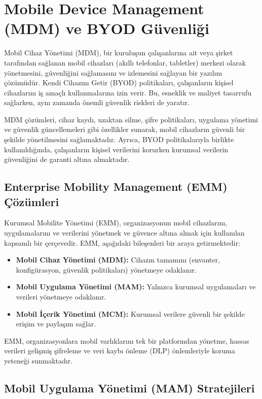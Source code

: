 \section{Mobile Device Management (MDM) ve BYOD Güvenliği}

Mobil Cihaz Yönetimi (MDM), bir kuruluşun çalışanlarına ait veya şirket tarafından sağlanan mobil cihazları (akıllı telefonlar, tabletler) merkezi olarak yönetmesini, güvenliğini sağlamasını ve izlemesini sağlayan bir yazılım çözümüdür. Kendi Cihazını Getir (BYOD) politikaları, çalışanların kişisel cihazlarını iş amaçlı kullanmalarına izin verir. Bu, esneklik ve maliyet tasarrufu sağlarken, aynı zamanda önemli güvenlik riskleri de yaratır.

MDM çözümleri, cihaz kaydı, uzaktan silme, şifre politikaları, uygulama yönetimi ve güvenlik güncellemeleri gibi özellikler sunarak, mobil cihazların güvenli bir şekilde yönetilmesini sağlamaktadır. Ayrıca, BYOD politikalarıyla birlikte kullanıldığında, çalışanların kişisel verilerini korurken kurumsal verilerin güvenliğini de garanti altına almaktadır.

\subsection{Enterprise Mobility Management (EMM) Çözümleri}

Kurumsal Mobilite Yönetimi (EMM), organizasyonun mobil cihazlarını, uygulamalarını ve verilerini yönetmek ve güvence altına almak için kullanılan kapsamlı bir çerçevedir. EMM, aşağıdaki bileşenleri bir araya getirmektedir:

\begin{itemize}
    \item \textbf{Mobil Cihaz Yönetimi (MDM):} Cihazın tamamını (envanter, konfigürasyon, güvenlik politikaları) yönetmeye odaklanır.
    \item \textbf{Mobil Uygulama Yönetimi (MAM):} Yalnızca kurumsal uygulamaları ve verileri yönetmeye odaklanır.
    \item \textbf{Mobil İçerik Yönetimi (MCM):} Kurumsal verilere güvenli bir şekilde erişim ve paylaşım sağlar.
\end{itemize}

EMM, organizasyonlara mobil varlıklarını tek bir platformdan yönetme, hassas verileri gelişmiş şifreleme ve veri kaybı önleme (DLP) önlemleriyle koruma yeteneği sunmaktadır.

\subsection{Mobil Uygulama Yönetimi (MAM) Stratejileri}

